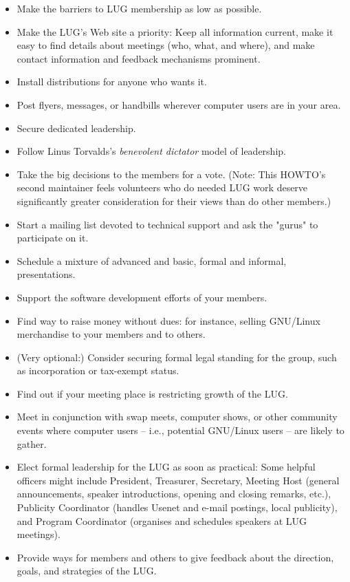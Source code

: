 \begin{itemize}
\item Make the barriers to LUG membership as low as possible.
\item Make the LUG's Web site a priority: Keep all information current, make it easy to find details about meetings (who, what, and where), and make contact information and feedback mechanisms prominent.
\item Install distributions for anyone who wants it.
\item Post flyers, messages, or handbills wherever computer users are in your area.
\item Secure dedicated leadership.
\item Follow Linus Torvalds's {\itshape benevolent dictator\/} model of leadership.
\item Take the big decisions to the members for a vote.  (Note:  This HOWTO's second maintainer feels volunteers who do needed LUG work deserve significantly greater consideration for their views than do other members.)
\item Start a mailing list devoted to technical support and ask the "gurus" to participate on it.
\item Schedule a mixture of advanced and basic, formal and informal, presentations.
\item Support the software development efforts of your members.
\item Find way to raise money without dues: for instance, selling GNU/Linux merchandise to your members and to others.
\item (Very optional:)  Consider securing formal legal standing for the group, such as incorporation or tax-exempt status.
\item Find out if your meeting place is restricting growth of the LUG.
\item Meet in conjunction with swap meets, computer shows, or other community events where computer users -- i.e., potential GNU/Linux users -- are likely to gather.
\item Elect formal leadership for the LUG as soon as practical: Some helpful officers might include President, Treasurer, Secretary, Meeting Host (general announcements, speaker introductions, opening and closing remarks, etc.), Publicity Coordinator (handles Usenet and e-mail postings, local publicity), and Program Coordinator (organises and schedules speakers at LUG meetings).
\item Provide ways for members and others to give feedback about the direction, goals, and strategies of the LUG.

\end{itemize}
